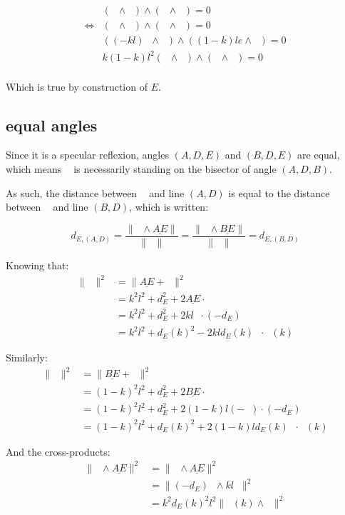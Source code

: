 \documentclass[10pt,a4paper]{article}
\newcommand{\ud}[1]{\underline{#1}}
\DeclareMathOperator{\cross}{\wedge}
\DeclareMathOperator{\E}{\ud{E}}
\DeclareMathOperator{\DA}{\ud{DA}}
\DeclareMathOperator{\AD}{\ud{AD}}
\DeclareMathOperator{\DB}{\ud{DB}}
\DeclareMathOperator{\BD}{\ud{BD}}
\DeclareMathOperator{\ED}{\ud{ED}}
\DeclareMathOperator{\EA}{\ud{EA}}
\DeclareMathOperator{\EB}{\ud{EB}}
\DeclareMathOperator{\e}{\ud{e}}
\DeclareMathOperator{\n}{\ud{n}}
\begin{document}
$$
\begin{array}{lll}
    & ( \DA \cross \n ) \cross ( \DB \cross \n ) = 0\\
    \Leftrightarrow
    & ( \EA \cross \n ) \cross ( \EB \cross \n ) = 0\\
    & ( (-kl)\e \cross \n ) \cross ( (1-k)le \cross \n ) = 0\\
    & k(1-k)l^2(\e \cross \n) \cross (\e \cross \n) = 0\\
\end{array}
$$

Which is true by construction of $E$.

\subsection{equal angles}

Since it is a specular reflexion, angles $(A,D,E)$ and $(B,D,E)$ are equal,
which means $\E$ is necessarily standing on the bisector of angle $(A, D, B)$.

As such, the distance between $\E$ and line $(A, D)$ is equal to the distance
between $\E$ and line $(B, D)$, which is written:

$$
d_{E,(A,D)}
= \frac{\| \AD \cross \ud{AE} \|}{\| \AD \|}
= \frac{\| \BD \cross \ud{BE} \|}{\| \BD \|}
= d_{E,(B,D)}
$$

Knowing that:
$$
\begin{array}{lll}
    \| \AD \|^2
    & = \| \ud{AE} + \ED \|^2\\
    & = k^2l^2 + d_E^2 + 2\ud{AE} \cdot \ED\\
    & = k^2l^2 + d_E^2 + 2 kl\e \cdot (-d_E)\n\\
    & = k^2l^2 + d_E(k)^2 - 2 kld_E(k) \e \cdot \n(k)
\end{array}
$$

Similarly:
$$
\begin{array}{lll}
    \| \BD \|^2
    & = \| \ud{BE} + \ED \|^2\\
    & = (1-k)^2l^2 + d_E^2 + 2\ud{BE} \cdot \ED\\
    & = (1-k)^2l^2 + d_E^2 + 2 (1-k)l(-\e) \cdot (-d_E)\n\\
    & = (1-k)^2l^2 + d_E(k)^2 + 2 (1-k)ld_E(k) \e \cdot \n(k)
\end{array}
$$

And the cross-products:
$$
\begin{array}{lll}
    \| \AD \cross \ud{AE} \|^2
    & = \| \ED \cross \ud{AE} \|^2\\
    & = \| (-d_E)\n \cross kl\e \|^2\\
    & = k^2d_E(k)^2l^2 \| \n(k) \cross \e \|^2\\
\end{array}
$$
\end{document}

